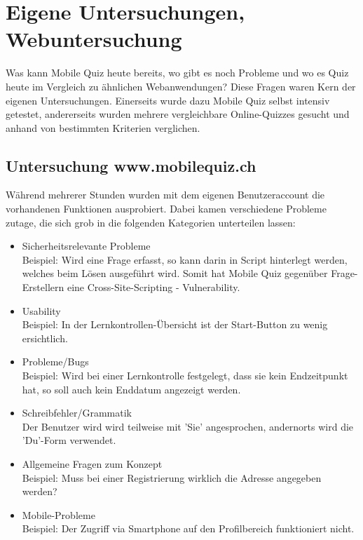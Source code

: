 
\section{Eigene Untersuchungen, Webuntersuchung}


Was kann Mobile Quiz heute bereits, wo gibt es noch Probleme und wo es Quiz heute im Vergleich zu ähnlichen Webanwendungen? Diese Fragen waren Kern der eigenen Untersuchungen. Einerseits wurde dazu Mobile Quiz selbst intensiv getestet, andererseits wurden mehrere vergleichbare Online-Quizzes gesucht und anhand von bestimmten Kriterien verglichen.


	\subsection{Untersuchung www.mobilequiz.ch}
	Während mehrerer Stunden wurden mit dem eigenen Benutzeraccount die vorhandenen Funktionen ausprobiert. Dabei kamen verschiedene Probleme zutage, die sich grob in die folgenden Kategorien unterteilen lassen:
	
	
	\begin{itemize}
		\item Sicherheitsrelevante Probleme \\
		Beispiel: Wird eine Frage erfasst, so kann darin in Script hinterlegt werden, welches beim Lösen ausgeführt wird. Somit hat Mobile Quiz gegenüber Frage-Erstellern eine \gls{Cross-Site-Scripting} - \gls{Vulnerability}.
		\item Usability \\
		Beispiel: In der Lernkontrollen-Übersicht ist der Start-Button zu wenig ersichtlich.
		\item Probleme/Bugs \\
		Beispiel: Wird bei einer Lernkontrolle festgelegt, dass sie kein Endzeitpunkt hat, so soll auch kein Enddatum angezeigt werden.
		\item Schreibfehler/Grammatik \\
		Der Benutzer wird wird teilweise mit 'Sie' angesprochen, andernorts wird die 'Du'-Form verwendet.
		\item Allgemeine Fragen zum Konzept \\
		Beispiel: Muss bei einer Registrierung wirklich die Adresse angegeben werden?
		\item Mobile-Probleme \\
		Beispiel: Der Zugriff via Smartphone auf den Profilbereich funktioniert nicht.
	\end{itemize}

